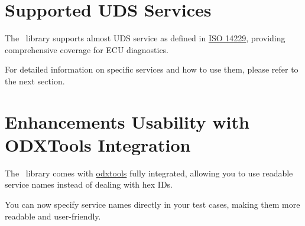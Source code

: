 \section{Supported UDS Services}
The \pkg\ library supports almost UDS service as defined in 
\href{https://automotive.wiki/index.php/ISO_14229}{ISO 14229}, 
providing comprehensive coverage for ECU diagnostics.

For detailed information on specific services and how to use them, please refer 
to the next section.

\section{Enhancements Usability with ODXTools Integration}
The \pkg\ library comes with 
\href{https://github.com/mercedes-benz/odxtools}{odxtools} fully integrated, 
allowing you to use readable service names instead of dealing with hex IDs.

You can now specify service names directly in your test cases, 
making them more readable and user-friendly.

